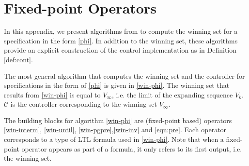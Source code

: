 \section{Fixed-point Operators}\label{app:basic-alg}

In this appendix, we present algorithms from \cite{Nilsson2017} to compute the winning set for a specification in the form \eqref{phi}. In addition to the winning set, these algorithms provide an explicit construction of the control implementation as in Definition \ref{def:cont}. 

The most general algorithm that computes the winning set and the controller for specifications in the form of \eqref{phi} is given in \eqref{win-phi}. The winning set that results from \eqref{win-phi} is equal to $ V_{\infty} $, i.e. the limit of the expanding sequence $V_k$. $ \mathcal{C} $ is the controller corresponding to the winning set $ V_{\infty} $. 

The building blocks for algorithm \eqref{win-phi} are (fixed-point based) operators \eqref{win-interm}, \eqref{win-until}, \eqref{win-pgpre},\eqref{win-inv} and \eqref{eqn:pre}. Each operator corresponds to a type of LTL formula used in \eqref{win-phi}. Note that when a fixed-point operator appears as part of a formula, it only refers to its first output, i.e. the winning set.




